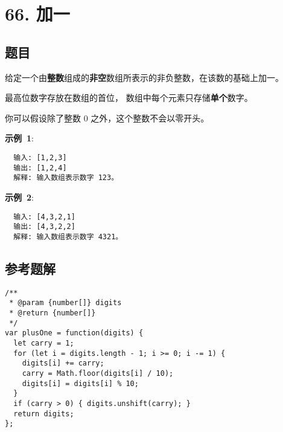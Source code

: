 \newpage
\section{66. 加一}
\label{leetcode:66}

\subsection{题目}

给定一个由\textbf{整数}组成的\textbf{非空}数组所表示的非负整数，在该数的基础上加一。

最高位数字存放在数组的首位， 数组中每个元素只存储\textbf{单个}数字。

你可以假设除了整数 0 之外，这个整数不会以零开头。

\textbf{示例 1}:

\begin{verbatim}
  输入: [1,2,3]
  输出: [1,2,4]
  解释: 输入数组表示数字 123。
\end{verbatim}

\textbf{示例 2}:

\begin{verbatim}
  输入: [4,3,2,1]
  输出: [4,3,2,2]
  解释: 输入数组表示数字 4321。
\end{verbatim}

\subsection{参考题解}

\begin{verbatim}
/**
 * @param {number[]} digits
 * @return {number[]}
 */
var plusOne = function(digits) {
  let carry = 1;
  for (let i = digits.length - 1; i >= 0; i -= 1) {
    digits[i] += carry;
    carry = Math.floor(digits[i] / 10);
    digits[i] = digits[i] % 10;
  }
  if (carry > 0) { digits.unshift(carry); }
  return digits;
};
\end{verbatim}
